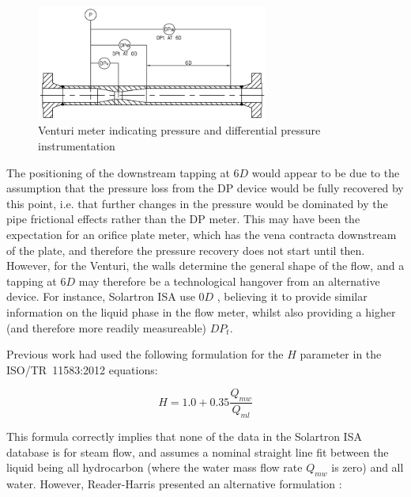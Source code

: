 \documentclass[journal]{IEEEtran}
\begin{document}
\begin{figure}[ht]
\centering
\includegraphics[width=3.0in]{Venturi.png}
\caption[]{ Venturi meter indicating pressure and differential pressure\\instrumentation }
\label{fig:Venturi}
\end{figure}

The positioning of the downstream tapping at $6D$ would appear to be due to the assumption that the pressure loss from the DP device would be fully recovered by this point, i.e. that further changes in the pressure would be dominated by the pipe frictional effects rather than the DP meter.  This may have been the expectation for an orifice plate meter, which has the vena contracta downstream of the plate, and therefore the pressure recovery does not start until then.  However, for the Venturi, the walls determine the general shape of the flow, and a tapping at $6D$ may therefore be a technological hangover from an alternative device.  For instance, Solartron ISA use $0D$ \cite{Collins2017PLR1}, believing it to provide similar information on the liquid phase in the flow meter, whilst also providing a higher (and therefore more readily measureable) $DP_{t}$.



Previous work \cite{Collins2015} had used the following formulation for the $H$ parameter in the ISO/TR~11583:2012  \cite{2012ISO/TRConduits} equations:

\begin{equation}
H = 1.0 + 0.35 \frac{Q_{mw}}{Q_{ml}}    
\end{equation}

This formula correctly implies that none of the data in the Solartron ISA database is for steam flow, and assumes a nominal straight line fit between the liquid being all hydrocarbon (where the water mass flow rate $Q_{mw}$ is zero) and all water.  However, Reader-Harris presented an alternative formulation \cite{Reader-Harris2017}:
\end{document}
